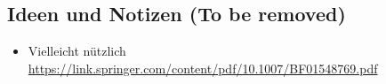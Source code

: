 \subsection{Ideen und Notizen (To be removed)}

\begin{itemize}
  \item Vielleicht nützlich \url{https://link.springer.com/content/pdf/10.1007/BF01548769.pdf}
\end{itemize}
